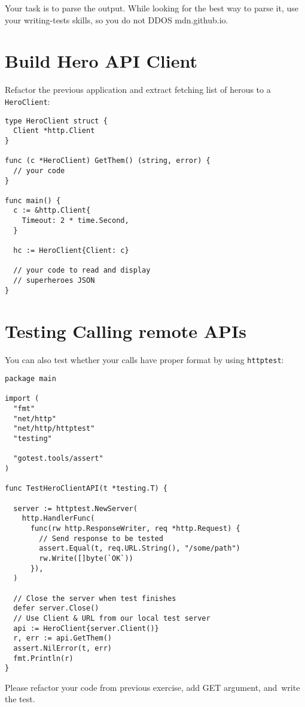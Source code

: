 \documentclass[11pt, letterpaper]{article}
\begin{document}
Your task is to parse the output. While looking for the best way to parse it, use your writing-tests skills, so you do not DDOS mdn.github.io.

\section{Build Hero API Client}

Refactor the previous application and extract fetching list of herous to a \verb|HeroClient|:

\begin{verbatim}
type HeroClient struct {
  Client *http.Client
}

func (c *HeroClient) GetThem() (string, error) {
  // your code
}

func main() {
  c := &http.Client{
    Timeout: 2 * time.Second,
  }

  hc := HeroClient{Client: c}
  
  // your code to read and display 
  // superheroes JSON
}
\end{verbatim}

\section{Testing Calling remote APIs}

You can also test whether your calls have proper format by using \texttt{httptest}:

\begin{verbatim}
package main

import (
  "fmt"
  "net/http"
  "net/http/httptest"
  "testing"

  "gotest.tools/assert"
)

func TestHeroClientAPI(t *testing.T) {

  server := httptest.NewServer(
    http.HandlerFunc(
      func(rw http.ResponseWriter, req *http.Request) {
        // Send response to be tested
        assert.Equal(t, req.URL.String(), "/some/path") 
        rw.Write([]byte(`OK`))
      }),
  )

  // Close the server when test finishes
  defer server.Close()
  // Use Client & URL from our local test server
  api := HeroClient{server.Client()}
  r, err := api.GetThem()
  assert.NilError(t, err)
  fmt.Println(r)
}
\end{verbatim}

Please refactor your code from previous exercise, add GET argument, and~write the test.
\end{document}
